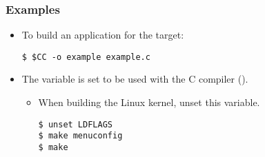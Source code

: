 \begin{frame}[fragile]
  \frametitle{Examples}
  \begin{itemize}
    \item To build an application for the target:
      \begin{block}{}
        \begin{verbatim}
$ $CC -o example example.c
        \end{verbatim}
      \end{block}
    \item The  variable is set to be used with the C
      compiler ().
      \begin{itemize}
        \item When building the Linux kernel, unset this variable.
          \begin{block}{}
            \begin{verbatim}
$ unset LDFLAGS
$ make menuconfig
$ make
            \end{verbatim}
          \end{block}
      \end{itemize}
  \end{itemize}
\end{frame}
